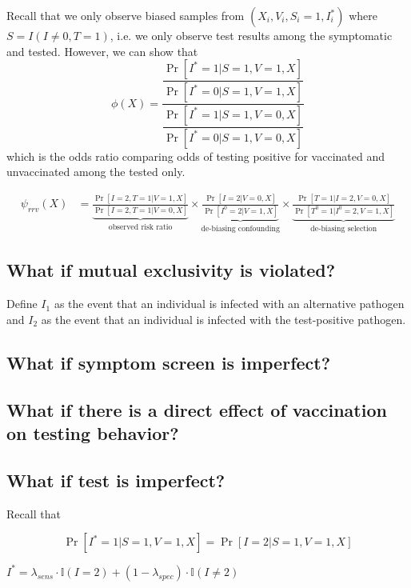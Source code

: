 \begin{appendix}
Recall that we only observe biased samples from $(X_i, V_i, S_i = 1, I^*_i)$ where $S = I(I \neq 0, T = 1)$, i.e. we only observe test results among the symptomatic and tested. However, we can show that 
    \begin{equation}
         \phi(X) = \dfrac{\dfrac{\Pr[I^* = 1 | S = 1, V = 1, X]}{\Pr[I^* = 0 | S = 1, V = 1, X]}}{\dfrac{\Pr[I^* = 1 | S = 1, V = 0, X]}{\Pr[I^* = 0 | S = 1, V = 0, X]}}
    \end{equation}    
which is the odds ratio comparing odds of testing positive for vaccinated and unvaccinated among the tested only.

\begin{align*}
    \psi_{rrv}(X) &=\underbrace{\frac{\Pr[I = 2, T = 1 | V = 1, X]}{\Pr[I = 2, T = 1 | V = 0, X]}}_{\text{observed risk ratio}} \times \underbrace{\frac{\Pr[I = 2 | V = 0, X]}{\Pr[I^0 = 2 | V = 1, X]}}_{\text{de-biasing confounding}} \times \underbrace{\frac{\Pr[T = 1 | I = 2, V = 0, X]}{\Pr[T^0 = 1 | I^0 = 2, V = 1, X]}}_{\text{de-biasing selection}} 
\end{align*}

\subsection{What if mutual exclusivity is violated?}
Define $I_1$ as the event that an individual is infected with an alternative pathogen and $I_2$ as the event that an individual is infected with the test-positive pathogen. 

\subsection{What if symptom screen is imperfect?}

\subsection{What if there is a direct effect of vaccination on testing behavior?}

\subsection{What if test is imperfect?}
Recall that 

$$\Pr[I^* = 1 | S = 1, V = 1, X] = \Pr[I = 2 | S = 1, V = 1, X]$$

$I^* = \lambda_{sens} \cdot \mathbb{I}(I = 2) + (1 - \lambda_{spec}) \cdot \mathbb{I}(I \neq 2)$
\end{appendix}

